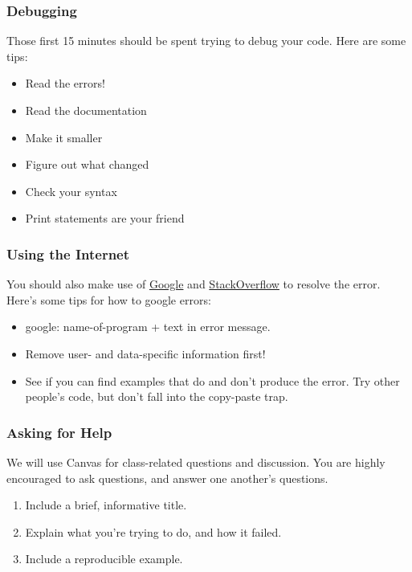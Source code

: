 \documentclass[]{book}
\providecommand{\tightlist}{%
  \setlength{\itemsep}{0pt}\setlength{\parskip}{0pt}}
\begin{document}
\subsubsection*{Debugging}\label{debugging}

Those first 15 minutes should be spent trying to debug your code. Here
are some tips:

\begin{itemize}
\tightlist
\item
  Read the errors!
\item
  Read the documentation
\item
  Make it smaller
\item
  Figure out what changed
\item
  Check your syntax
\item
  Print statements are your friend
\end{itemize}

\subsubsection*{Using the Internet}\label{using-the-internet}

You should also make use of \href{https://www.google.com}{Google} and
\href{http://stackoverflow.com/}{StackOverflow} to resolve the error.
Here's some tips for how to google errors:

\begin{itemize}
\tightlist
\item
  google: name-of-program + text in error message.
\item
  Remove user- and data-specific information first!
\item
  See if you can find examples that do and don't produce the error. Try
  other people's code, but don't fall into the copy-paste trap.
\end{itemize}

\subsubsection*{Asking for Help}\label{asking-for-help}

We will use Canvas for class-related questions and discussion. You are
highly encouraged to ask questions, and answer one another's questions.

\begin{enumerate}
\def\labelenumi{\arabic{enumi}.}
\tightlist
\item
  Include a brief, informative title.
\item
  Explain what you're trying to do, and how it failed.
\item
  Include a reproducible example.
\end{enumerate}
\end{document}
